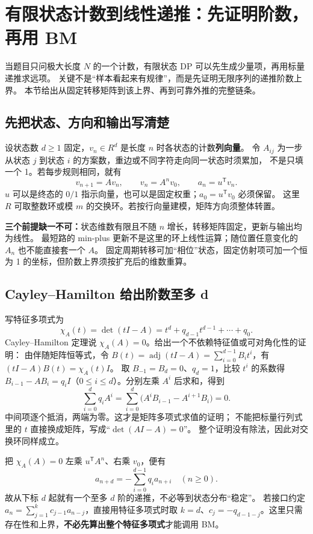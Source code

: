 \section{有限状态计数到线性递推：先证明阶数，再用 BM}\label{knowledge-state-recurrence}
当题目只问极大长度 $N$ 的一个计数，有限状态 DP 可以先生成少量项，再用标量递推求远项。
关键不是“样本看起来有规律”，而是先证明无限序列的递推阶数上界。
本节给出从固定转移矩阵到该上界、再到可靠外推的完整链条。

\subsection{先把状态、方向和输出写清楚}
设状态数 $d\ge1$ 固定，$v_n\in R^d$ 是长度 $n$ 时各状态的计数\textbf{列向量}。
令 $A_{ij}$ 为一步从状态 $j$ 到状态 $i$ 的方案数，重边或不同字符走向同一状态时须累加，
不是只填一个 1。若每步规则相同，就有
\[
v_{n+1}=Av_n,\qquad v_n=A^nv_0,\qquad a_n=u^{\mathsf T}v_n.
\]
$u$ 可以是终态的 $0/1$ 指示向量，也可以是固定权重；$a_0=u^{\mathsf T}v_0$ 必须保留。
这里 $R$ 可取整数环或模 $m$ 的交换环。若按行向量建模，矩阵方向须整体转置。

\textbf{三个前提缺一不可：}状态维数有限且不随 $n$ 增长，转移矩阵固定，更新与输出均为线性。
最短路的 min-plus 更新不是这里的环上线性运算；随位置任意变化的 $A_n$ 也不能直接套一个 $A$。
固定周期转移可加“相位”状态，固定仿射项可加一个恒为 1 的坐标，但阶数上界须按扩充后的维数重算。

\subsection{Cayley--Hamilton 给出阶数至多 d}
写特征多项式为
\[
\chi_A(t)=\det(tI-A)=t^d+q_{d-1}t^{d-1}+\cdots+q_0.
\]
Cayley--Hamilton 定理说 $\chi_A(A)=0$。给出一个不依赖特征值或可对角化性的证明：
由伴随矩阵恒等式，令 $B(t)=\operatorname{adj}(tI-A)=\sum_{i=0}^{d-1}B_it^i$，有
$(tI-A)B(t)=\chi_A(t)I$。
取 $B_{-1}=B_d=0$、$q_d=1$，比较 $t^i$ 的系数得
$B_{i-1}-AB_i=q_iI$（$0\le i\le d$）。分别左乘 $A^i$ 后求和，得到
\[
\sum_{i=0}^d q_iA^i
=\sum_{i=0}^d\bigl(A^iB_{i-1}-A^{i+1}B_i\bigr)=0.
\]
中间项逐个抵消，两端为零。这才是矩阵多项式求值的证明；
不能把标量行列式里的 $t$ 直接换成矩阵，写成“$\det(AI-A)=0$”。
整个证明没有除法，因此对交换环同样成立。

把 $\chi_A(A)=0$ 左乘 $u^{\mathsf T}A^n$、右乘 $v_0$，便有
\[
\boxed{a_{n+d}=-\sum_{i=0}^{d-1}q_i a_{n+i}\quad(n\ge0).}
\]
故从下标 $d$ 起就有一个至多 $d$ 阶的递推，不必等到状态分布“稳定”。
若接口约定 $a_n=\sum_{j=1}^k c_{j-1}a_{n-j}$，直接用特征多项式时取
$k=d$、$c_j=-q_{d-1-j}$。这里只需存在性和上界，\textbf{不必先算出整个特征多项式}才能调用 BM。

